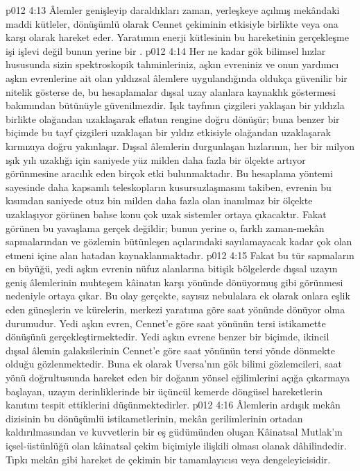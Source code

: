 \vs p012 4:13 Âlemler genişleyip daraldıkları zaman, yerleşkeye açılmış mekândaki maddi kütleler, dönüşümlü olarak Cennet çekiminin etkisiyle birlikte veya ona karşı olarak hareket eder. Yaratımın enerji kütlesinin bu hareketinin gerçekleşme işi  işlevi değil bunun yerine bir .
\vs p012 4:14 Her ne kadar gök bilimsel hızlar hususunda sizin spektroskopik tahminleriniz, aşkın evreniniz ve onun yardımcı aşkın evrenlerine ait olan yıldızsal âlemlere uygulandığında oldukça güvenilir bir nitelik gösterse de, bu hesaplamalar dışsal uzay alanlara kaynaklık göstermesi bakımından bütünüyle güvenilmezdir. Işık tayfının çizgileri yaklaşan bir yıldızla birlikte olağandan uzaklaşarak eflatun rengine doğru dönüşür; buna benzer bir biçimde bu tayf çizgileri uzaklaşan bir yıldız etkisiyle olağandan uzaklaşarak kırmızıya doğru yakınlaşır. Dışsal âlemlerin durgunlaşan hızlarının, her bir milyon ışık yılı uzaklığı için saniyede yüz milden daha fazla bir ölçekte artıyor görünmesine aracılık eden birçok etki bulunmaktadır. Bu hesaplama yöntemi sayesinde daha kapsamlı teleskopların kusursuzlaşmasını takiben, evrenin bu kısımdan saniyede otuz bin milden daha fazla olan inanılmaz bir ölçekte uzaklaşıyor görünen bahse konu çok uzak sistemler ortaya çıkacaktır. Fakat görünen bu yavaşlama gerçek değildir; bunun yerine o, farklı zaman\hyp{}mekân sapmalarından ve gözlemin bütünleşen açılarındaki sayılamayacak kadar çok olan etmeni içine alan hatadan kaynaklanmaktadır.
\vs p012 4:15 Fakat bu tür sapmaların en büyüğü, yedi aşkın evrenin nüfuz alanlarına bitişik bölgelerde dışsal uzayın geniş âlemlerinin muhteşem kâinatın karşı yönünde dönüyormuş gibi görünmesi nedeniyle ortaya çıkar. Bu olay gerçekte, sayısız nebulalara ek olarak onlara eşlik eden güneşlerin ve kürelerin, merkezi yaratıma göre saat yönünde dönüyor olma durumudur. Yedi aşkın evren, Cennet’e göre saat yönünün tersi istikamette dönüşünü gerçekleştirmektedir. Yedi aşkın evrene benzer bir biçimde, ikincil dışsal âlemin galaksilerinin Cennet’e göre saat yönünün tersi yönde dönmekte olduğu gözlenmektedir. Buna ek olarak Uversa’nın gök bilimi gözlemcileri, saat yönü doğrultusunda hareket eden bir doğanın yönsel eğilimlerini açığa çıkarmaya başlayan, uzayın derinliklerinde bir üçüncül kemerde döngüsel hareketlerin kanıtını tespit ettiklerini düşünmektedirler.
\vs p012 4:16 Âlemlerin ardışık mekân dizisinin bu dönüşümlü istikametlerinin, mekân gerilimlerinin ortadan kaldırılmasından ve kuvvetlerin bir eş güdümünden oluşan Kâinatsal Mutlak’ın içsel\hyp{}üstünlüğü olan kâinatsal çekim biçimiyle ilişkili olması olanak dâhilindedir. Tıpkı mekân gibi hareket de çekimin bir tamamlayıcısı veya dengeleyicisidir.
